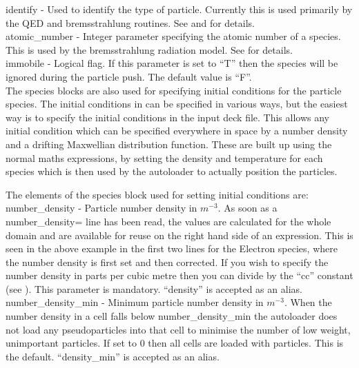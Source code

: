 {\emphtext identify} - Used to identify the type of particle. Currently this
is used primarily by the QED and bremsstrahlung routines. See 
and  for details.\\

{\emphtext atomic\_number} - Integer parameter specifying the atomic number of
a species. This is used by the bremsstrahlung radiation model. See
 for details.\\

{\emphtext immobile} - Logical flag. If this parameter is set to ``T'' then
the species will be ignored during the particle push. The default value
is ``F''.\\

The species blocks are also used for specifying initial conditions for
the particle species. The initial conditions in {\EPOCH} can be specified in
various ways, but the easiest way is to specify the initial conditions in the
input deck file. This allows any initial condition which can be specified
everywhere in space by a number density and a drifting Maxwellian distribution
function.
These are built up using the normal maths
expressions, by setting the density and temperature for each species which is
then used by the autoloader to actually position the particles.

The elements of the species block used for setting
initial conditions are:\\

{\emphtext number\_density} - Particle number density in $m^{-3}$.
As soon as a number\_density= line has been read, the values are
calculated for the whole domain and are available for reuse on the right hand
side of an expression. This is seen in the above example in the first two lines
for the Electron species, where the number density is first set and then
corrected.  If you wish to specify the number density in parts per cubic metre
then you can divide by the ``cc'' constant (see ).
This parameter is mandatory. ``density'' is accepted as an alias.\\

{\emphtext number\_density\_min} - Minimum particle number density in $m^{-3}$.
When the number density in a cell falls below number\_density\_min the
autoloader does not load any pseudoparticles into that cell to minimise the
number of low weight, unimportant particles. If set to 0 then all cells are
loaded with particles. This is the default. ``density\_min'' is accepted
as an alias.\\

